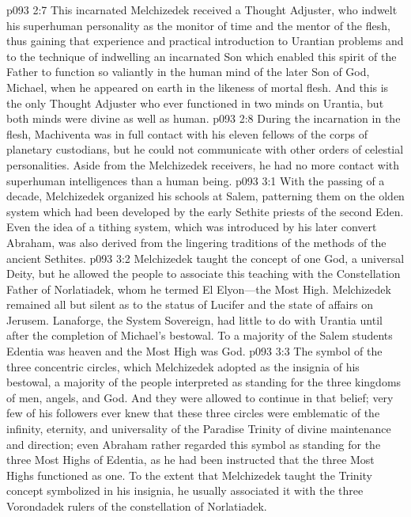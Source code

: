 \pc \vs p093 2:7 This incarnated Melchizedek received a Thought Adjuster, who indwelt his superhuman personality as the monitor of time and the mentor of the flesh, thus gaining that experience and practical introduction to Urantian problems and to the technique of indwelling an incarnated Son which enabled this spirit of the Father to function so valiantly in the human mind of the later Son of God, Michael, when he appeared on earth in the likeness of mortal flesh. And this is the only Thought Adjuster who ever functioned in two minds on Urantia, but both minds were divine as well as human.
\vs p093 2:8 During the incarnation in the flesh, Machiventa was in full contact with his eleven fellows of the corps of planetary custodians, but he could not communicate with other orders of celestial personalities. Aside from the Melchizedek receivers, he had no more contact with superhuman intelligences than a human being.
\vs p093 3:1 With the passing of a decade, Melchizedek organized his schools at Salem, patterning them on the olden system which had been developed by the early Sethite priests of the second Eden. Even the idea of a tithing system, which was introduced by his later convert Abraham, was also derived from the lingering traditions of the methods of the ancient Sethites.
\vs p093 3:2 Melchizedek taught the concept of one God, a universal Deity, but he allowed the people to associate this teaching with the Constellation Father of Norlatiadek, whom he termed El Elyon---the Most High. Melchizedek remained all but silent as to the status of Lucifer and the state of affairs on Jerusem. Lanaforge, the System Sovereign, had little to do with Urantia until after the completion of Michael’s bestowal. To a majority of the Salem students Edentia was heaven and the Most High was God.
\vs p093 3:3 The symbol of the three concentric circles, which Melchizedek adopted as the insignia of his bestowal, a majority of the people interpreted as standing for the three kingdoms of men, angels, and God. And they were allowed to continue in that belief; very few of his followers ever knew that these three circles were emblematic of the infinity, eternity, and universality of the Paradise Trinity of divine maintenance and direction; even Abraham rather regarded this symbol as standing for the three Most Highs of Edentia, as he had been instructed that the three Most Highs functioned as one. To the extent that Melchizedek taught the Trinity concept symbolized in his insignia, he usually associated it with the three Vorondadek rulers of the constellation of Norlatiadek.
